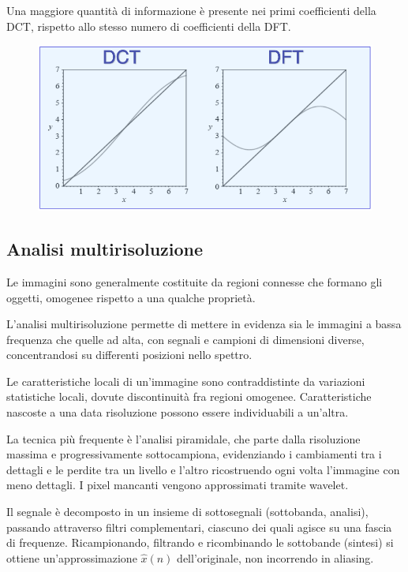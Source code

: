 Una maggiore quantità di informazione è presente nei primi coefficienti della DCT, rispetto allo stesso numero di coefficienti della DFT.

\begin{figure}[h]
	\centering
	\includegraphics[scale=0.27]{Lezioni/Immagini/dctdft}
\end{figure}

\subsection{Analisi multirisoluzione}
Le immagini sono generalmente costituite da regioni connesse che formano gli oggetti, omogenee rispetto a una qualche proprietà.

L'analisi multirisoluzione permette di mettere in evidenza sia le immagini a bassa frequenza che quelle ad alta, con segnali e campioni di dimensioni diverse, concentrandosi su differenti posizioni nello spettro. 

Le caratteristiche locali di un'immagine sono contraddistinte da variazioni statistiche locali, dovute  discontinuità fra regioni omogenee. Caratteristiche nascoste a una data risoluzione possono essere individuabili a un'altra.

La tecnica più frequente è l'analisi piramidale, che parte dalla risoluzione massima e progressivamente sottocampiona, evidenziando i cambiamenti tra i dettagli e le perdite tra un livello e l'altro ricostruendo ogni volta l'immagine con meno dettagli. I pixel mancanti vengono approssimati tramite wavelet.

Il segnale è decomposto in un insieme di sottosegnali (sottobanda, analisi), passando attraverso filtri complementari, ciascuno dei quali agisce su una fascia di frequenze. Ricampionando, filtrando e ricombinando le sottobande (sintesi) si ottiene un'approssimazione $\hat{x}(n)$ dell'originale, non incorrendo in aliasing. 

